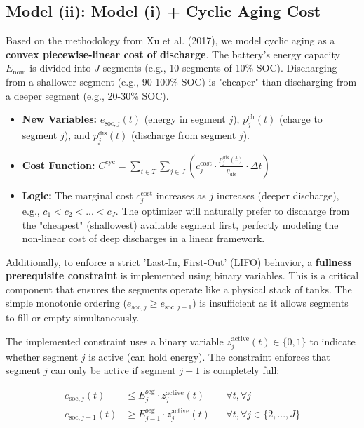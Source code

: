 \documentclass[11pt, a4paper]{article}
\begin{document}
\subsection{Model (ii): Model (i) + Cyclic Aging Cost}
Based on the methodology from Xu et al. (2017), we model cyclic aging as a \textbf{convex piecewise-linear cost of discharge}. The battery's energy capacity $E_{\mathrm{nom}}$ is divided into $J$ segments (e.g., 10 segments of 10\% SOC). Discharging from a shallower segment (e.g., 90-100\% SOC) is "cheaper" than discharging from a deeper segment (e.g., 20-30\% SOC).
\begin{itemize}
    \item \textbf{New Variables:} $e_{\mathrm{soc},j}(t)$ (energy in segment $j$), $p^{\mathrm{ch}}_{j}(t)$ (charge to segment $j$), and $p^{\mathrm{dis}}_{j}(t)$ (discharge from segment $j$).
    \item \textbf{Cost Function:} $C^{\mathrm{cyc}} = \sum_{t \in T} \sum_{j \in J} \left( c^{\mathrm{cost}}_{j} \cdot \frac{p^{\mathrm{dis}}_{j}(t)}{\eta_{\mathrm{dis}}} \cdot \Delta t \right)$
    \item \textbf{Logic:} The marginal cost $c^{\mathrm{cost}}_{j}$ increases as $j$ increases (deeper discharge), e.g., $c_1 < c_2 < ... < c_J$. The optimizer will naturally prefer to discharge from the "cheapest" (shallowest) available segment first, perfectly modeling the non-linear cost of deep discharges in a linear framework.
\end{itemize}

Additionally, to enforce a strict 'Last-In, First-Out' (LIFO) behavior, a \textbf{fullness prerequisite constraint} is implemented using binary variables. This is a critical component that ensures the segments operate like a physical stack of tanks. The simple monotonic ordering ($e_{\mathrm{soc},j} \ge e_{\mathrm{soc},j+1}$) is insufficient as it allows segments to fill or empty simultaneously.

The implemented constraint uses a binary variable $z^{\text{active}}_j(t) \in \{0,1\}$ to indicate whether segment $j$ is active (can hold energy). The constraint enforces that segment $j$ can only be active if segment $j-1$ is completely full:

\begin{align}
    e_{\mathrm{soc},j}(t) &\le E^{\mathrm{seg}}_{j} \cdot z^{\text{active}}_j(t) && \forall t, \forall j \label{eq:seg_activation} \\
    e_{\mathrm{soc},j-1}(t) &\ge E^{\mathrm{seg}}_{j-1} \cdot z^{\text{active}}_j(t) && \forall t, \forall j \in \{2, ..., J\} \label{eq:lifo_fullness}
\end{align}
\end{document}
